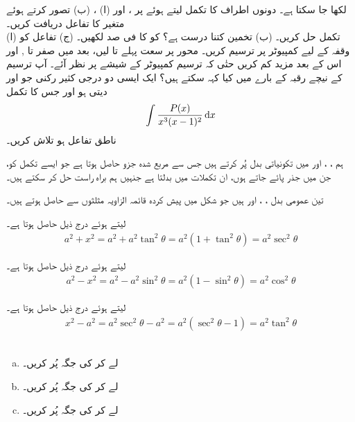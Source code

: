 لکھا جا سکتا ہے۔ دونوں اطراف کا تکمل لیتے ہوئے  پر ، اور (ا) ، (ب)  تصور کرتے ہوئے  متغیر  کا تفاعل  دریافت کریں۔ 
\\
(ا) تکمل  حل کریں۔ (ب) تخمین  کتنا درست ہے؟  کو  کا فی صد لکھیں۔ (ج) تفاعل  کو وقفہ  کے لیے کمپیوٹر پر  ترسیم کریں۔ محور  پر سعت پہلے  تا  لیں، بعد میں  صفر تا  , اور اس کے بعد مزید کم کریں حتٰی کہ ترسیم  کمپیوٹر کے شیشے پر نظر آئے۔ آپ ترسیم کے نیچے رقبہ کے بارے میں کیا کہہ سکتے ہیں؟
ایک ایسی دو درجی کثیر رکنی  جو  اور  دیتی ہو اور جس کا تکمل 
\begin{align*}
\int \frac{P(x)}{x^3(x-1)^2}\dif x
\end{align*}
ناطق تفاعل ہو تلاش کریں۔



ہم ، ،  اور  میں تکونیاتی بدل پُر کرتے ہیں جس سے     مربع  شدہ جزو حاصل ہوتا ہے جو ایسے تکمل کو، جن میں   جذر پائے جاتے ہوں،  ان  تکملات میں بدلتا ہے جنہیں ہم براہ راست    حل کر سکتے ہیں۔

تین عمومی بدل ، ،  اور  ہیں جو شکل  میں پیش کردہ   قائمہ الزاویہ  مثلثوں سے حاصل ہوتے ہیں۔

 لیتے ہوئے درج ذیل حاصل ہوتا ہے۔
\begin{align}
a^2+x^2=a^2+a^2\tan^2\theta=a^2(1+\tan^2\theta)=a^2\sec^2\theta
\end{align}

 لیتے ہوئے درج ذیل حاصل ہوتا ہے۔
\begin{align}
a^2-x^2=a^2-a^2\sin^2\theta=a^2(1-\sin^2\theta)=a^2\cos^2\theta
\end{align}

 لیتے ہوئے درج ذیل حاصل ہوتا ہے۔
\begin{align}
x^2-a^2=a^2\sec^2\theta-a^2=a^2(\sec^2\theta-1)=a^2\tan^2\theta
\end{align}
\\
\begin{enumerate}[a.]
\item
{} لے کر  کی جگہ  پُر کریں۔
\item
{} لے کر  کی جگہ  پُر کریں۔
\item
{} لے کر  کی جگہ  پُر کریں۔
\end{enumerate}


